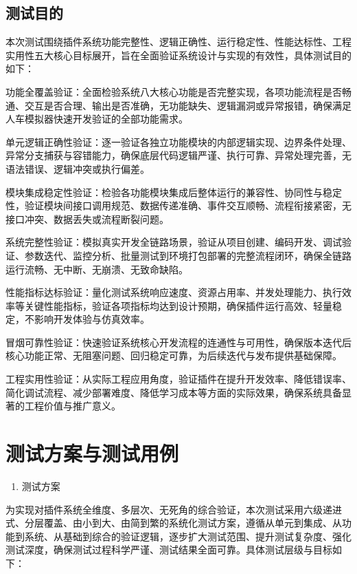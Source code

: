 \subsection{测试目的}

本次测试围绕插件系统功能完整性、逻辑正确性、运行稳定性、性能达标性、工程实用性五大核心目标展开，旨在全面验证系统设计与实现的有效性，具体测试目的如下：

功能全覆盖验证：全面检验系统八大核心功能是否完整实现，各项功能流程是否畅通、交互是否合理、输出是否准确，无功能缺失、逻辑漏洞或异常报错，确保满足人车模拟器快速开发验证的全部功能需求。

单元逻辑正确性验证：逐一验证各独立功能模块的内部逻辑实现、边界条件处理、异常分支捕获与容错能力，确保底层代码逻辑严谨、执行可靠、异常处理完善，无语法错误、逻辑冲突或执行偏差。

模块集成稳定性验证：检验各功能模块集成后整体运行的兼容性、协同性与稳定性，验证模块间接口调用规范、数据传递准确、事件交互顺畅、流程衔接紧密，无接口冲突、数据丢失或流程断裂问题。

系统完整性验证：模拟真实开发全链路场景，验证从项目创建、编码开发、调试验证、参数迭代、监控分析、批量测试到环境打包部署的完整流程闭环，确保全链路运行流畅、无中断、无崩溃、无致命缺陷。

性能指标达标验证：量化测试系统响应速度、资源占用率、并发处理能力、执行效率等关键性能指标，验证各项指标均达到设计预期，确保插件运行高效、轻量稳定，不影响开发体验与仿真效率。

冒烟可靠性验证：快速验证系统核心开发流程的连通性与可用性，确保版本迭代后核心功能正常、无阻塞问题、回归稳定可靠，为后续迭代与发布提供基础保障。

工程实用性验证：从实际工程应用角度，验证插件在提升开发效率、降低错误率、简化调试流程、减少部署难度、降低学习成本等方面的实际效果，确保系统具备显著的工程价值与推广意义。

\section{测试方案与测试用例}

\begin{enumerate}
\def\labelenumi{\arabic{enumi}.}
\item
  测试方案
\end{enumerate}

为实现对插件系统全维度、多层次、无死角的综合验证，本次测试采用六级递进式、分层覆盖、由小到大、由简到繁的系统化测试方案，遵循从单元到集成、从功能到系统、从基础到综合的验证逻辑，逐步扩大测试范围、提升测试复杂度、强化测试深度，确保测试过程科学严谨、测试结果全面可靠。具体测试层级与目标如下：

